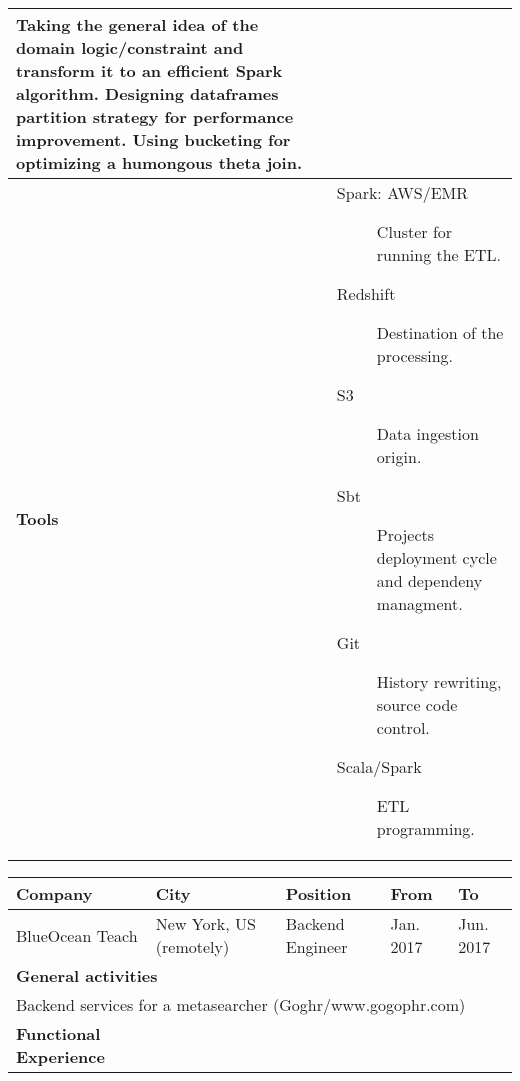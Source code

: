 \begin{cventries}
\begin{tabular}{|p{4.5cm} | p{2cm} | p{4cm} | p{2cm} | p{2cm}|}
{ Taking the general idea of the domain logic/constraint and transform it to an efficient Spark algorithm. Designing dataframes partition strategy for performance improvement. Using bucketing for optimizing a humongous theta join.
      
      } \\
       \hline
      \textbf{Tools} & \multicolumn{4}{p{12cm}|}{
                       \begin{description}
                       \item[Spark: AWS/EMR] Cluster for running the ETL.
            
                       \item[Redshift] Destination of the processing.
                       \item[S3] Data ingestion origin.

                       \item[Sbt] Projects deployment cycle and dependeny managment.
                       \item[Git] History rewriting, source code control.

                       \item[Scala/Spark] ETL programming.

                       \end{description}
      } \\
 

    \hline

  \end{tabular}



 \begin{tabular}{|p{4.5cm} | p{2cm} | p{4cm} | p{2cm} | p{2cm}|}
    \hline
    \textbf{Company} & 
    \textbf{City} & 
    \textbf{Position} & 
    \textbf{From} & \textbf{To} \\
     \hline
    BlueOcean Teach & 
    New York, US \hspace{1cm} (remotely) & 
    Backend Engineer & 
    
    Jan. 2017 & Jun. 2017 \\ 
    \hline
    \multicolumn{5}{|l|}{\textbf{General activities}} \\

     \multicolumn{5}{|p{15cm}|}{
       Backend services for a metasearcher (Goghr/www.gogophr.com)
       } \\
 \hline
    \textbf{Functional Experience} & \multicolumn{4}{p{12cm}|}{

}
\end{tabular}
\end{cventries}
